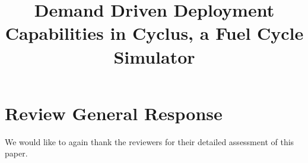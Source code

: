 \documentclass[answers,11pt]{exam}
\begin{document}



\title{Demand Driven Deployment Capabilities in Cyclus, a Fuel Cycle Simulator}



%

\section*{Review General Response}
We would like to again thank the reviewers for their detailed assessment of
this paper.
\end{document}
